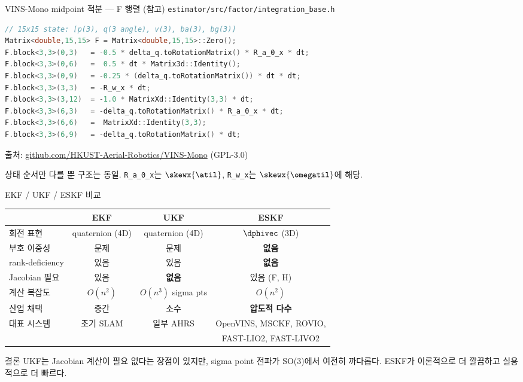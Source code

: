 \begin{frame}[fragile]{VINS-Mono midpoint 적분 — F 행렬 (참고)}
  \texttt{estimator/src/factor/integration\_base.h}
\begin{lstlisting}[language=C++, basicstyle=\ttfamily\tiny]
// 15x15 state: [p(3), q(3 angle), v(3), ba(3), bg(3)]
Matrix<double,15,15> F = Matrix<double,15,15>::Zero();
F.block<3,3>(0,3)   = -0.5 * delta_q.toRotationMatrix() * R_a_0_x * dt;
F.block<3,3>(0,6)   =  0.5 * dt * Matrix3d::Identity();
F.block<3,3>(0,9)   = -0.25 * (delta_q.toRotationMatrix()) * dt * dt;
F.block<3,3>(3,3)   = -R_w_x * dt;
F.block<3,3>(3,12)  = -1.0 * MatrixXd::Identity(3,3) * dt;
F.block<3,3>(6,3)   = -delta_q.toRotationMatrix() * R_a_0_x * dt;
F.block<3,3>(6,6)   =  MatrixXd::Identity(3,3);
F.block<3,3>(6,9)   = -delta_q.toRotationMatrix() * dt;
\end{lstlisting}
  {\footnotesize 출처: \url{github.com/HKUST-Aerial-Robotics/VINS-Mono} (GPL-3.0)}
  \vspace{0.2em}

  상태 순서만 다를 뿐 구조는 동일. \texttt{R\_a\_0\_x}는 $\skewx{\atil}$, \texttt{R\_w\_x}는 $\skewx{\omegatil}$에 해당.
\end{frame}

\begin{frame}{EKF / UKF / ESKF 비교}
  \begin{center}\footnotesize
  \begin{tabular}{lccc}
    \toprule
    & \textbf{EKF} & \textbf{UKF} & \textbf{ESKF} \\
    \midrule
    회전 표현 & quaternion (4D) & quaternion (4D) & $\dphivec$ (3D) \\
    부호 이중성 & 문제 & 문제 & \textbf{없음} \\
    rank-deficiency & 있음 & 있음 & \textbf{없음} \\
    Jacobian 필요 & 있음 & \textbf{없음} & 있음 (F, H) \\
    계산 복잡도 & $O(n^2)$ & $O(n^3)$ sigma pts & $O(n^2)$ \\
    산업 채택 & 중간 & 소수 & \textbf{압도적 다수} \\
    \midrule
    대표 시스템 & 초기 SLAM & 일부 AHRS & OpenVINS, MSCKF, ROVIO, \\
    & & & FAST-LIO2, FAST-LIVO2 \\
    \bottomrule
  \end{tabular}
  \end{center}
  \pause
  \vspace{0.2em}
  \begin{alertblock}{결론}
    UKF는 Jacobian 계산이 필요 없다는 장점이 있지만, sigma point 전파가 SO(3)에서 여전히 까다롭다.
    ESKF가 이론적으로 더 깔끔하고 실용적으로 더 빠르다.
  \end{alertblock}
\end{frame}

